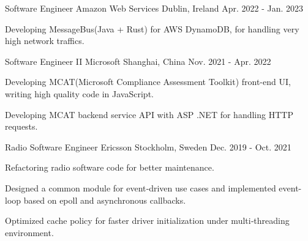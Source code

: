 

\begin{cventries}

\cventry
    {Software Engineer} %
    {Amazon Web Services} %
    {Dublin, Ireland} %
    {Apr. 2022 - Jan. 2023} %
    {
      \begin{cvitems} %
        \item {Developing MessageBus(Java + Rust) for AWS DynamoDB, for handling very high network traffics.}
      \end{cvitems}
    }

\cventry
    {Software Engineer II} %
    {Microsoft} %
    {Shanghai, China} %
    {Nov. 2021 - Apr. 2022} %
    {
      \begin{cvitems} %
        \item {Developing MCAT(Microsoft Compliance Assessment Toolkit) front-end UI, writing high quality code in JavaScript.}
        \item {Developing MCAT backend service API with ASP .NET for handling HTTP requests.}
      \end{cvitems}
    }


 \cventry
    {Radio Software Engineer} %
    {Ericsson} %
    {Stockholm, Sweden} %
    {Dec. 2019 - Oct. 2021} %
    {
      \begin{cvitems} %
        \item {Refactoring radio software code for better maintenance.}
        \item {Designed a common module for event‐driven use cases and implemented event-loop based on epoll and asynchronous callbacks.}
        \item {Optimized cache policy for faster driver initialization under multi‐threading environment.}
      \end{cvitems}
    }


\end{cventries}
